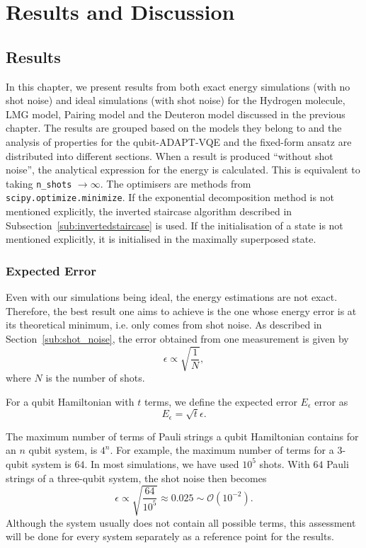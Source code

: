 \part{Results and Discussion}
\chapter{Results}
\label{chap:results}
In this chapter, we present results from both exact energy simulations (with no shot noise) and ideal simulations (with shot noise) for the Hydrogen molecule, LMG model, Pairing model and the Deuteron model discussed in the previous chapter. The results are grouped based on the models they belong to and the analysis of properties for the qubit-ADAPT-VQE and the fixed-form ansatz are distributed into different sections. 
When a result is produced ``without shot noise'', the analytical expression for the energy is calculated. This is equivalent to taking \texttt{n\_shots} $ \to \infty $. The optimisers are methods from \texttt{scipy.optimize.minimize}. If the exponential decomposition method is not mentioned explicitly, the inverted staircase algorithm described in Subsection~\ref{sub:invertedstaircase} is used. If the initialisation of a state is not mentioned explicitly, it is initialised in the maximally superposed state.

\section{Expected Error}
\label{sec:exp_error}
Even with our simulations being ideal, the energy estimations are not exact. Therefore, the best result one aims to achieve is the one whose energy error is at its theoretical minimum, i.e. only comes from shot noise. As described in Section~\ref{sub:shot_noise}, the error obtained from one measurement is given by 
\begin{equation}
	\label{eq:shot_noise}
	\epsilon \propto \sqrt{\frac{1}{N}},
\end{equation}
where $ N $ is the number of shots. 

For a qubit Hamiltonian with $ t $ terms, we define the expected error $ E_\epsilon $ error as
\[ E_{\epsilon}= \sqrt{t} \epsilon. \]


The maximum number of terms of Pauli strings a qubit Hamiltonian contains for an $n $ qubit system, is $ 4^n $. For example, the maximum number of terms for a $3$-qubit system is $64$. In most simulations, we have used $10^5$ shots. With $64$ Pauli strings of a three-qubit system, the shot noise then becomes
\[  \epsilon \propto \sqrt{\frac{64}{10^5}} \approx 0.025 \sim \mathcal{O}(10^{-2}).\]
Although the system usually does not contain all possible terms, this assessment will be done for every system separately as a reference point for the results.

